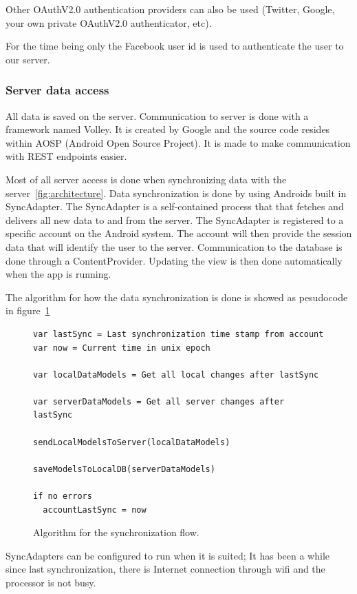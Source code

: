 Other OAuthV2.0 authentication providers can also be used (Twitter, Google, your own private OAuthV2.0 authenticator, etc). 

For the time being only the Facebook user id is used to authenticate the user to our server.

\subsubsection{Server data access}

All data is saved on the server. Communication to server is done with a framework named Volley. It is created by Google and the source code resides within AOSP (Android Open Source Project). It is made to make communication with REST endpoints easier.

Most of all server access is done when synchronizing data with the server~\ref{fig:architecture}. 
Data synchronization is done by using Androids built in SyncAdapter. The SyncAdapter is a self-contained process that that fetches and delivers all new data to and from the server. The SyncAdapter is registered to a specific account on the Android system. The account will then provide the session data that will identify the user to the server.
Communication to the database is done through a ContentProvider. Updating the view is then done automatically when the app is running. 

The algorithm for how the data synchronization is done is showed as pesudocode in figure~\ref{fig:algorithm_sync}

\begin{figure}[H]
\begin{lstlisting}[]
var lastSync = Last synchronization time stamp from account
var now = Current time in unix epoch

var localDataModels = Get all local changes after lastSync

var serverDataModels = Get all server changes after lastSync

sendLocalModelsToServer(localDataModels)

saveModelsToLocalDB(serverDataModels)

if no errors
  accountLastSync = now
\end{lstlisting}
\caption{Algorithm for the synchronization flow.}
\label{fig:algorithm_sync}
\end{figure}

SyncAdapters can be configured to run when it is suited; It has been a while since last synchronization, there is Internet connection through wifi and the processor is not busy.

